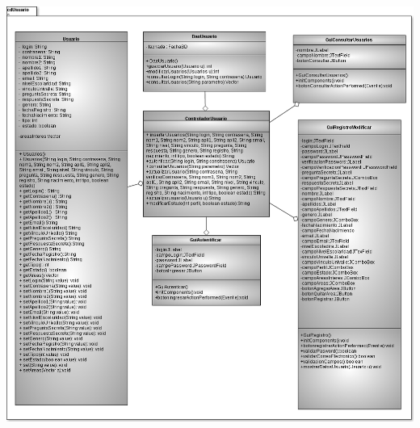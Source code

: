 \documentclass[11pt]{article}
\begin{document}
			\begin{minipage}[c]{1\linewidth}
				\centering
				\includegraphics[width=17cm, height=22cm]{DiagramasClase/Usuarios}
			\end{minipage}	
		
\end{document}
